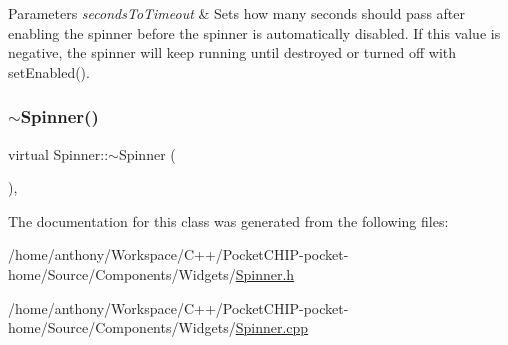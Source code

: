 \begin{DoxyParams}{Parameters}
{\em seconds\+To\+Timeout} & Sets how many seconds should pass after enabling the spinner before the spinner is automatically disabled. If this value is negative, the spinner will keep running until destroyed or turned off with set\+Enabled(). \\
\hline
\end{DoxyParams}
\mbox{\label{classSpinner_aa5f030932425393cb35a7a69158103e9}} 
\subsubsection{\texorpdfstring{$\sim$\+Spinner()}{~Spinner()}}
{\footnotesize\ttfamily virtual Spinner\+::$\sim$\+Spinner (\begin{DoxyParamCaption}{ }\end{DoxyParamCaption})\hspace{0.3cm}{\ttfamily [inline]}, {\ttfamily [virtual]}}



The documentation for this class was generated from the following files\+:\begin{DoxyCompactItemize}
\item 
/home/anthony/\+Workspace/\+C++/\+Pocket\+C\+H\+I\+P-\/pocket-\/home/\+Source/\+Components/\+Widgets/\mbox{\hyperlink{Spinner_8h}{Spinner.\+h}}\item 
/home/anthony/\+Workspace/\+C++/\+Pocket\+C\+H\+I\+P-\/pocket-\/home/\+Source/\+Components/\+Widgets/\mbox{\hyperlink{Spinner_8cpp}{Spinner.\+cpp}}\end{DoxyCompactItemize}
